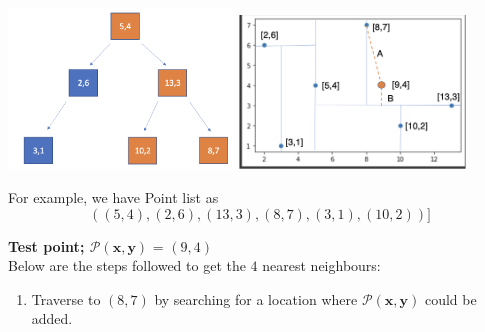 \begin{mscexample}


    \begin{minipage}[t]{\linewidth}
        \centering
        \includegraphics[width=6cm]{graphs/KD-Tree_KNN_Tree.png}
        \label{fig:$K$D-Tree_for_KNN Query}
        \hfill
        \includegraphics[width=6cm]{graphs/KD-Tree_KNN_plot.png}
        \label{fig:KD_Tree_KNN_Plot}
    \end{minipage}
	For example, we have Point list as $$((5,4),(2,6),(13,3),(8,7),(3,1),(10,2))]$$ 
	
	\textbf{Test point; $\mathcal{P}(\boldsymbol{x}, \boldsymbol{y})$} = $(9,4)$\\
	
	
	Below are the steps followed to get the $4$ nearest neighbours:
	\begin{enumerate}
    	\item Traverse to $(8,7)$ by searching for a location where $\mathcal{P}(\boldsymbol{x}, \boldsymbol{y})$ could be added.
    	

\end{enumerate}
\end{mscexample}
